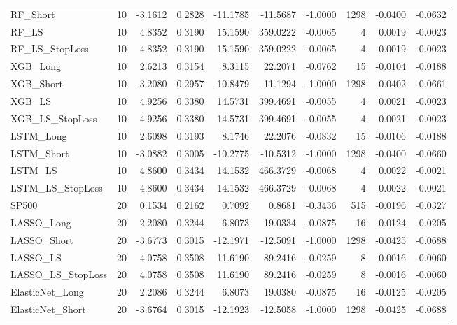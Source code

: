 \begin{tabular}{llrrrrrrrr}
\cline{1-10}
RF\_Short & 10 & -3.1612 & 0.2828 & -11.1785 & -11.5687 & -1.0000 & 1298 & -0.0400 & -0.0632 \\
\cline{1-10}
RF\_LS & 10 & 4.8352 & 0.3190 & 15.1590 & 359.0222 & -0.0065 & 4 & 0.0019 & -0.0023 \\
\cline{1-10}
RF\_LS\_StopLoss & 10 & 4.8352 & 0.3190 & 15.1590 & 359.0222 & -0.0065 & 4 & 0.0019 & -0.0023 \\
\cline{1-10}
XGB\_Long & 10 & 2.6213 & 0.3154 & 8.3115 & 22.2071 & -0.0762 & 15 & -0.0104 & -0.0188 \\
\cline{1-10}
XGB\_Short & 10 & -3.2080 & 0.2957 & -10.8479 & -11.1294 & -1.0000 & 1298 & -0.0402 & -0.0661 \\
\cline{1-10}
XGB\_LS & 10 & 4.9256 & 0.3380 & 14.5731 & 399.4691 & -0.0055 & 4 & 0.0021 & -0.0023 \\
\cline{1-10}
XGB\_LS\_StopLoss & 10 & 4.9256 & 0.3380 & 14.5731 & 399.4691 & -0.0055 & 4 & 0.0021 & -0.0023 \\
\cline{1-10}
LSTM\_Long & 10 & 2.6098 & 0.3193 & 8.1746 & 22.2076 & -0.0832 & 15 & -0.0106 & -0.0188 \\
\cline{1-10}
LSTM\_Short & 10 & -3.0882 & 0.3005 & -10.2775 & -10.5312 & -1.0000 & 1298 & -0.0400 & -0.0660 \\
\cline{1-10}
LSTM\_LS & 10 & 4.8600 & 0.3434 & 14.1532 & 466.3729 & -0.0068 & 4 & 0.0022 & -0.0021 \\
\cline{1-10}
LSTM\_LS\_StopLoss & 10 & 4.8600 & 0.3434 & 14.1532 & 466.3729 & -0.0068 & 4 & 0.0022 & -0.0021 \\
\cline{1-10}
SP500 & 20 & 0.1534 & 0.2162 & 0.7092 & 0.8681 & -0.3436 & 515 & -0.0196 & -0.0327 \\
\cline{1-10}
LASSO\_Long & 20 & 2.2080 & 0.3244 & 6.8073 & 19.0334 & -0.0875 & 16 & -0.0124 & -0.0205 \\
\cline{1-10}
LASSO\_Short & 20 & -3.6773 & 0.3015 & -12.1971 & -12.5091 & -1.0000 & 1298 & -0.0425 & -0.0688 \\
\cline{1-10}
LASSO\_LS & 20 & 4.0758 & 0.3508 & 11.6190 & 89.2416 & -0.0259 & 8 & -0.0016 & -0.0060 \\
\cline{1-10}
LASSO\_LS\_StopLoss & 20 & 4.0758 & 0.3508 & 11.6190 & 89.2416 & -0.0259 & 8 & -0.0016 & -0.0060 \\
\cline{1-10}
ElasticNet\_Long & 20 & 2.2086 & 0.3244 & 6.8073 & 19.0380 & -0.0875 & 16 & -0.0125 & -0.0205 \\
\cline{1-10}
ElasticNet\_Short & 20 & -3.6764 & 0.3015 & -12.1923 & -12.5058 & -1.0000 & 1298 & -0.0425 & -0.0688 \\

\end{tabular}
